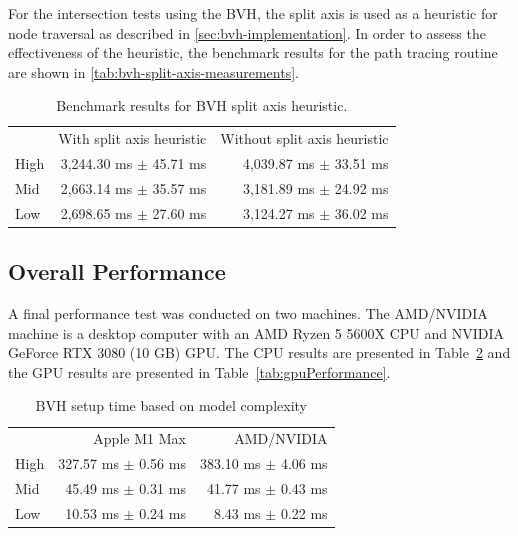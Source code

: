 For the intersection tests using the \gls{BVH}, the split axis is used as a heuristic for node traversal as described in \autoref{sec:bvh-implementation}. In order to assess the effectiveness of the heuristic, the benchmark results for the path tracing routine are shown in \autoref{tab:bvh-split-axis-measurements}.

\begin{table}[H]
    \centering
    \begin{tabular}{@{}lrr@{}}
    \toprule
    & With split axis heuristic & Without split axis heuristic \\
    High & 3,244.30 ms $\pm$ 45.71 ms & 4,039.87 ms $\pm$ 33.51 ms \\
    Mid & 2,663.14 ms $\pm$ 35.57 ms & 3,181.89 ms $\pm$ 24.92 ms \\
    Low & 2,698.65 ms $\pm$ 27.60 ms & 3,124.27 ms $\pm$ 36.02 ms \\
    \bottomrule
    \end{tabular}
    \caption{Benchmark results for \gls{BVH} split axis heuristic.}
    \label{tab:bvh-split-axis-measurements}
\end{table}

\subsection*{Overall Performance}

A final performance test was conducted on two machines. The AMD/NVIDIA machine is a desktop computer with an AMD Ryzen 5 5600X \gls{CPU} and NVIDIA GeForce RTX 3080 (10 GB) \gls{GPU}. The \gls{CPU} results are presented in Table~\ref{tab:cpuPerformance} and the \gls{GPU} results are presented in Table~\ref{tab:gpuPerformance}.

\begin{table}[H]
  \centering
  \begin{tabular}{lrr}
    \toprule
    & Apple M1 Max    & AMD/NVIDIA \\
    High     & 327.57 ms $\pm$ 0.56 ms     & 383.10 ms $\pm$ 4.06 ms \\
    Mid     & 45.49 ms $\pm$ 0.31 ms    & 41.77 ms $\pm$ 0.43 ms \\
    Low     & 10.53 ms $\pm$ 0.24 ms    & 8.43 ms $\pm$ 0.22 ms \\
    \bottomrule
  \end{tabular}
  \caption{\gls{BVH} setup time based on model complexity}
  \label{tab:cpuPerformance}
\end{table}

